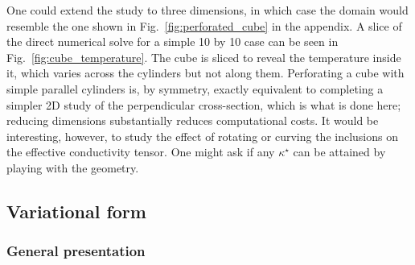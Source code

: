 \documentclass{article}
\makeatletter
\providecommand\FloatBarrier{\par\begingroup\let\@elt\relax
  \edef\@tempa{\@botlist\@deferlist\@dbldeferlist}%
  \ifx\@tempa\@empty\else\clearpage\fi\endgroup}
\makeatother
\begin{document}
One could extend the study to three dimensions, in which case the domain would
resemble the one shown in Fig.~\ref{fig:perforated_cube} in the appendix. A slice of the direct numerical solve for a simple 10 by 10 case can be seen in Fig.~\ref{fig:cube_temperature}. The cube is sliced to reveal the temperature inside it, which varies across the cylinders but not along them. Perforating a cube with simple parallel cylinders is, by symmetry, exactly equivalent to completing a simpler 2D study of the perpendicular cross-section, which is what is done here; reducing dimensions substantially reduces computational costs. It would be interesting, however, to
study the effect of rotating or curving the inclusions on the effective
conductivity tensor. One might ask if any $\kappa^{\star}$ can be attained by
playing with the geometry.

\FloatBarrier
\subsection{Variational form}

\FloatBarrier
\subsubsection{General presentation}
\end{document}
